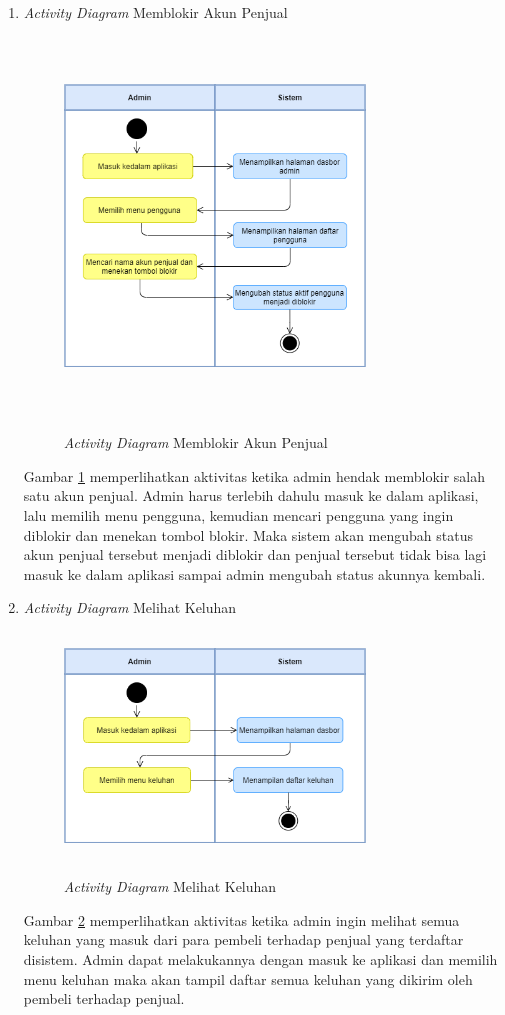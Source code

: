 \begin{enumerate}
	\newpage
	\item \textit{Activity Diagram} Memblokir Akun Penjual
	\begin{figure}[H]
		\centering
		{\includegraphics [width = 8cm, height= 10cm]{gambar/activity diagram/blokir penjual}}
		\caption{\textit{Activity Diagram} Memblokir Akun Penjual}
		\label{blokir penjual}
	\end{figure}
	\par Gambar \ref*{blokir penjual} memperlihatkan aktivitas ketika admin hendak memblokir salah satu akun penjual. Admin harus terlebih dahulu masuk ke dalam aplikasi, lalu memilih menu pengguna, kemudian mencari pengguna yang ingin diblokir dan menekan tombol blokir. Maka sistem akan mengubah status akun penjual tersebut menjadi diblokir dan penjual tersebut tidak bisa lagi masuk ke dalam aplikasi sampai admin mengubah status akunnya kembali.

	\item \textit{Activity Diagram} Melihat Keluhan
	\begin{figure}[H]
		\centering
		{\includegraphics [width = 8cm, height= 6cm]{gambar/activity diagram/lihat keluhan}}
		\caption{\textit{Activity Diagram} Melihat Keluhan}
		\label{lihat keluhan}
	\end{figure}
	\par Gambar \ref*{lihat keluhan} memperlihatkan aktivitas ketika admin ingin melihat semua keluhan yang masuk dari para pembeli terhadap penjual yang terdaftar disistem. Admin dapat melakukannya dengan masuk ke aplikasi dan memilih menu keluhan maka akan tampil daftar semua keluhan yang dikirim oleh pembeli terhadap penjual.


\end{enumerate}
